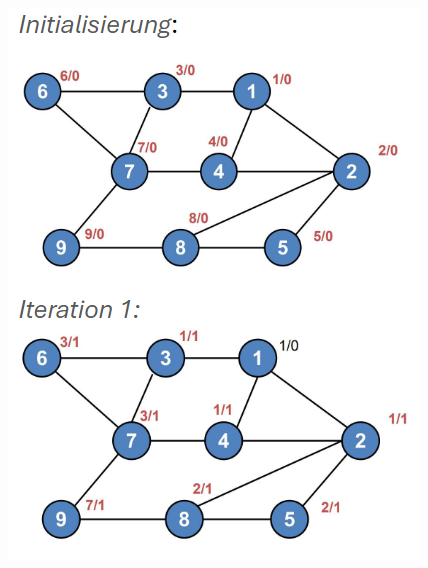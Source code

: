 \begin{example}
    \begin{minipage}{0.48\linewidth}
        \includegraphics[width=1\linewidth]{images/rapid_spanning_tree1.png}
    \end{minipage}
    \begin{minipage}{0.48\linewidth}

\end{minipage}
\end{example}

